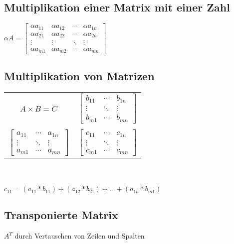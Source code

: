 \subsection{Multiplikation einer Matrix mit einer Zahl}
$ \alpha A = 
\begin{bmatrix}
    \alpha a_{11} & \alpha a_{12} & \cdots & \alpha a_{1n} \\
    \alpha a_{21} & \alpha a_{22} & \cdots & \alpha a_{2n} \\
    \vdots  & \vdots  & \ddots & \vdots  \\
    \alpha a_{m1} & \alpha a_{m2} & \cdots & \alpha a_{mn} 
\end{bmatrix}$

\subsection{Multiplikation von Matrizen}
\begin{tabular}{cc}
    $A \times B = C $ &
    $\begin{bmatrix}
        b_{11} & \cdots & b_{1n} \\
        \vdots & \ddots & \vdots  \\
        b_{m1} & \cdots & b_{mn} 
    \end{bmatrix}$ \\
    & \\
    $\begin{bmatrix}
        a_{11} & \cdots & a_{1n} \\
        \vdots & \ddots & \vdots  \\
        a_{m1} & \cdots & a_{mn} 
    \end{bmatrix}$ & 
    $\begin{bmatrix}
        c_{11} & \cdots & c_{1n} \\
        \vdots & \ddots & \vdots  \\
        c_{m1} & \cdots & c_{mn} 
    \end{bmatrix}$ \\
\end{tabular} \\ \\

$c_{11} = (a_{11} * b_{11}) + (a_{12} * b_{21}) + \dots + (a_{1n} * b_{m1}) $

\subsection{Transponierte Matrix}
$A^T$ durch Vertauschen von Zeilen und Spalten

